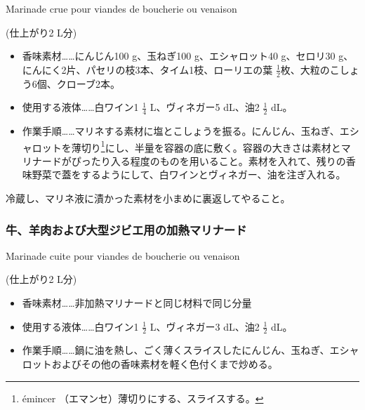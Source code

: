 \begin{recette}
\begin{frsubenv}
Marinade crue pour viandes de boucherie ou venaison

\end{frsubenv}


(仕上がり2 L分)

\begin{itemize}
\item
  香味素材\ldots{}\ldots{}にんじん100 g、玉ねぎ100 g、エシャロット40
  g、セロリ30 g、にんにく2片、パセリの枝3本、タイム1枝、ローリエの葉
  \(\frac{1}{2}\)枚、大粒のこしょう6個、クローブ2本。
\item
  使用する液体\ldots{}\ldots{}白ワイン1 \(\frac{1}{4}\) L、ヴィネガー5
  dL、油2 \(\frac{1}{2}\) dL。
\item
  作業手順\ldots{}\ldots{}マリネする素材に塩とこしょうを振る。にんじん、玉ねぎ、エシャロットを薄切り\footnote{émincer
    （エマンセ）薄切りにする、スライスする。}にし、半量を容器の底に敷く。容器の大きさは素材とマリナードがぴったり入る程度のものを用いること。素材を入れて、残りの香味野菜で蓋をするようにして、白ワインとヴィネガー、油を注ぎ入れる。
\end{itemize}

冷蔵し、マリネ液に漬かった素材を小まめに裏返してやること。

\atoaki{}

\hypertarget{marinade-cuite-pour-viandes-de-boucherie-ou-venaison}{%
\subsubsection{牛、羊肉および大型ジビエ用の加熱マリナード}\label{marinade-cuite-pour-viandes-de-boucherie-ou-venaison}}

\begin{frsubenv}

Marinade cuite pour viandes de boucherie ou venaison

\end{frsubenv}


(仕上がり2 L分)

\begin{itemize}
\item
  香味素材\ldots{}\ldots{}非加熱マリナードと同じ材料で同じ分量
\item
  使用する液体\ldots{}\ldots{}白ワイン1 \(\frac{1}{2}\) L、ヴィネガー3
  dL、油2 \(\frac{1}{2}\) dL。
\item
  作業手順\ldots{}\ldots{}鍋に油を熱し、ごく薄くスライスしたにんじん、玉ねぎ、エシャロットおよびその他の香味素材を軽く色付くまで炒める。


\end{itemize}
\end{recette}

